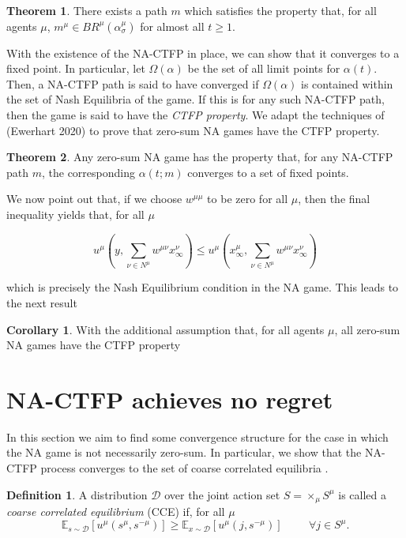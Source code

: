 \documentclass{article}
\theoremstyle{definition}
\newtheorem{definition}{Definition}
\newtheorem{theorem}{Theorem}
\newtheorem{corollary}{Corollary}
\newcommand{\wmunu}{w^{\mu \nu}}
\newcommand{\xmu}{x^{\mu}}
\newcommand{\xnu}{x^{\nu}}
\begin{document}
  \begin{theorem}
    There exists a path $m$ which satisfies the property that, for all agents $\mu$, $m^\mu \in
    BR^\mu(\alpha_\sigma^\mu)$ for almost all $t \geq 1$.
  \end{theorem}

With the existence of the NA-CTFP in place, we can show that it converges
to a fixed point. In particular, let $\Omega(\alpha)$ be the set of
all limit points for $\alpha(t)$. Then, a NA-CTFP path is said to have
converged if $\Omega(\alpha)$ is contained within the set of Nash
Equilibria of the game. If this is for any such NA-CTFP path, then the
game is said to have the \emph{CTFP property}. We adapt the techniques
of (Ewerhart 2020) to prove that zero-sum NA games have the CTFP
property.

  \begin{theorem}
    Any zero-sum NA game has the property that, for any NA-CTFP path $m$, the corresponding $\alpha(t; m)$ converges to a set of fixed points.
  \end{theorem}


  We now point out that, if we choose $w^{\mu \mu}$ to be zero for all $\mu$, then the final inequality yields that, for all $\mu$

  \begin{equation}
    u^\mu(y, \sum_{\nu \in N^\mu} \wmunu \xnu_\infty) \leq u^\mu(\xmu_\infty, \sum_{\nu \in N^\mu} \wmunu \xnu_\infty)
  \end{equation}

  which is precisely the Nash Equilibrium condition in the NA game. This leads to the next result

  \begin{corollary}
    With the additional assumption that, for all agents $\mu$, all zero-sum NA games have the CTFP property
  \end{corollary}

\section{NA-CTFP achieves no regret}
  \label{sec::CCEConvergence}

  In this section we aim to find some convergence structure for the
  case in which the NA game is not necessarily zero-sum. In
  particular, we show that the NA-CTFP process converges to the set of
  coarse correlated equilibria \cite{}.
  \begin{definition}
    A distribution $\mathcal{D}$ over the joint action set $S =
    \times_\mu S^\mu$ is called a \emph{coarse correlated equilibrium}
    (CCE) if, for all $\mu$
    \begin{equation}
      \mathbb{E}_{s \sim \mathcal{D}}[u^\mu (s^\mu, s^{- \mu})] \geq
      \mathbb{E}_{x \sim \mathcal{D}}[u^\mu (j, s^{-
          \mu})] \hspace{1cm} \forall j \in S^\mu.
    \end{equation}
  \end{definition}
\end{document}
